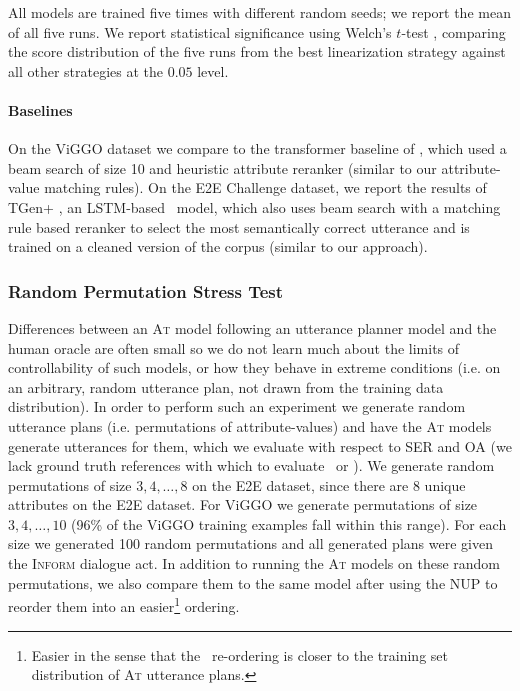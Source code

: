 All models are trained five times with different random seeds; we report the
mean of all five runs. We report statistical significance using Welch's
$t$-test \citep{welch1947}, comparing the score distribution of the five runs
from the best linearization strategy against all other strategies at the $0.05$
level.

\paragraph{Baselines} On the ViGGO dataset we compare to the transformer
baseline of \citet{juraska2019}, which used a beam search of size 10 and
heuristic attribute reranker (similar to our attribute-value matching rules).
On the E2E Challenge dataset, we report the results of TGen+ \citep{dusek2019},
an LSTM-based \sequencetosequence~model, which also uses beam search with a
matching rule based reranker to select the most semantically correct utterance
and is trained on a cleaned version of the corpus (similar to our approach).
 
\subsubsection{Random Permutation Stress Test}

Differences between an \textsc{At} model following an utterance planner model
and the human oracle are often small so we do not learn much about the limits
of controllability of such models, or how they behave in extreme conditions
(i.e. on an arbitrary, random utterance plan, not drawn from the training data
distribution). In order to perform such an experiment we generate random
utterance plans (i.e. permutations of attribute-values) and have the
\textsc{At} models generate utterances for them, which we evaluate with respect
to SER and OA (we lack ground truth references with which to evaluate \bleu~or
\rougel).  We generate random permutations of size $3,4,\ldots, 8$ on the E2E
dataset, since there are 8 unique attributes on the E2E dataset. For ViGGO we
generate permutations of size $3,4,\ldots,10$ (96\% of the ViGGO training
examples fall within this range). For each size we generated 100 random
permutations and all generated plans were given the \textsc{Inform} dialogue
act. In addition to running the \textsc{At} models on these random
permutations, we also compare them to the same model after using the NUP  to
reorder them into an easier\footnote{Easier in the sense that the
\NUP~re-ordering is closer to the training set distribution of \textsc{At}
utterance plans.} ordering.


